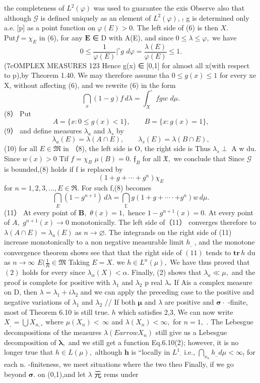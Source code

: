 the completeness of $L^{2}(\varphi)$ was used to guarantee the exis Observe also that although $\scriptstyle{\mathcal{G}}$ is defined uniquely as an element of $L^{2}(\varphi),\,_{!}$ g is determined only a.e. [p] as a point function on $\varphi(E)>0.$ The left side of (6) is then $X.$ $\mathrm{Put}f=\chi_{E}$ in (6), for any $\boldsymbol{E}$ ∈ D with A(E), and since $0\leq\lambda\leq\varphi,$ we have $$ 0\leq\frac{1}{\varphi(E)} \vert^{\circ}g\,\,d\varphi=\frac{\lambda(E)}{\varphi(E)}\leq1. $$ (7cOMPLEX MEASURES 123 Hence g(x) ∈ [0,1] for almost all x(with respect to p),by Theorem 1.40. We may therefore assume tha $0\leq g(x)\leq1$ for every xe X, without affecting (6), and we rewrite (6) in the form $$ \bigcap_{x}(1-g)f\,d\lambda=\int_{X}^{\circ}f g w\,\,d\mu. $$ (8） Put $$ A=\{x\colon0\leq g(x)<1\},\qquad B=\{x\colon g(x)=1\}, $$ (9） and define measures $\lambda_{a}$ and $\lambda_{s}$ by $$ \lambda_{a}(E)=\lambda(A\cap E),\qquad\lambda_{s}(E)=\lambda(B\cap E), $$ (10) for all $E\in{\mathfrak{M}}$ in （8), the left side is O, the right side is Thus $\lambda_{s}\perp$ A w du. Since $w(x)>0$ Tif $f=\chi_{B}$ $\mu(B)=0.$ ${\mathfrak{f}}_{B}$ for all ${\mathfrak{X}},$ we conclude that Since $\scriptstyle{\mathcal{G}}$ is bounded,(8) holds if f is replaced by $$ (1+g+\cdots+g^{n})\chi_{E} $$ for $n=1,2,3,\ldots,E\in\Re.$ For such f,(8) becomes $$ \bigcap_{E}(1-g^{n+1})\,d\lambda=\bigcap_{\textstyle\mathbb{E}}g(1+g+\cdots\cdot+g^{n})w\,d\mu. $$ (11） At every point of ${\boldsymbol{B}},$ $\theta(x)=1,$ hence $1-g^{n+1}(x)=0.$ At every point of $A,$ $g^{n+1}(x)\to0$ monotonically. The left side of（11） converges therefore to $\lambda(A\cap E)=\lambda_{a}(E)$ as $n\to\varnothing.$ The integrands on the right side of (11) increase monotonically to a non negative measurable limit $h_{\mathrm{,}}$ , and the monotone convergence theorem shows see that that the right side of $(11)$ tends to $\mathbf{tr}\,h$ du as $\textstyle n\!\to\!\infty$ $\scriptstyle{E (\scriptstyle{\frac{1}{R}}\in{\mathfrak{M}}}$ Taking $E=X.$ we $h\in L^{n}(\mu),$ We have thus proved that $(2)$ holds for every since $\lambda_{\alpha}(X)<\alpha.$ Finally, (2) shows that $\lambda_{a}\ll\mu,$ and the proof is complete for positive with $\lambda_{1}$ and $\lambda_{2}$ p real $\lambda_{*}$ If Ais a complex measure on D, then $\lambda=\lambda_{1}+i\lambda_{2}$ and we can apply the preceding case to the positive and negative variations of $\lambda_{1}$ and $\lambda_{2}$ // If both ${\boldsymbol{\mu}}$ and $\lambda$ are positive and ${\boldsymbol{\sigma}}\cdot$ -finite, most of Theorem 6.10 is still true. $\boldsymbol{\mathit{h}}$ which satisfies 2,3, We can now write $X_{_{\circ}}=\bigcup X_{n,\circ}$ where $\mu(X_{n})<\,\infty$ and $\lambda(X_{n})<\infty,$ for $n=1,$ . The Lebesgue decompositions of the measures $\lambda(E arrow X_{n})$ still give us a Lebesgue decomposition of ${\boldsymbol{\lambda}},$ and we still get a function Eq.6.10(2); however, it is no longer true that $h\in L(\mu),$ although $\boldsymbol{h}$ is “locally in $L^{1}{}_{\!\cdot\!}$ i.e., $\textstyle\bigcap_{x_{n}}h_{..}d\mu<\infty_{!}$ for each n. -finiteness, we meet situations where the two theo Finally, if we go beyond ${\boldsymbol{\sigma}}.$ on (0,1),and let $\lambda$ 元 rems under 